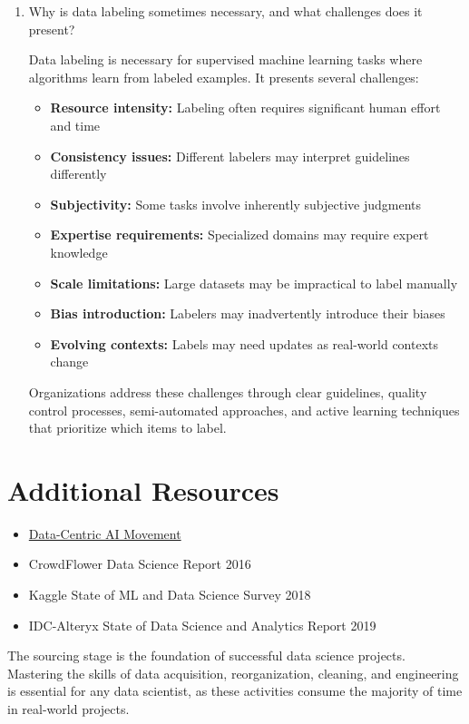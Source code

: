 \documentclass[12pt]{article}
\begin{document}
\begin{enumerate}
    \item Why is data labeling sometimes necessary, and what challenges does it present?
    
    \begin{tcolorbox}[colback=blue!5!white,colframe=blue!75!black,title=Solution]
    Data labeling is necessary for supervised machine learning tasks where algorithms learn from labeled examples. It presents several challenges:
    \begin{itemize}
        \item \textbf{Resource intensity:} Labeling often requires significant human effort and time
        \item \textbf{Consistency issues:} Different labelers may interpret guidelines differently
        \item \textbf{Subjectivity:} Some tasks involve inherently subjective judgments
        \item \textbf{Expertise requirements:} Specialized domains may require expert knowledge
        \item \textbf{Scale limitations:} Large datasets may be impractical to label manually
        \item \textbf{Bias introduction:} Labelers may inadvertently introduce their biases
        \item \textbf{Evolving contexts:} Labels may need updates as real-world contexts change
    \end{itemize}
    Organizations address these challenges through clear guidelines, quality control processes, semi-automated approaches, and active learning techniques that prioritize which items to label.
    \end{tcolorbox}
\end{enumerate}

\section{Additional Resources}

\begin{itemize}
    \item \href{https://datacentricai.org/}{Data-Centric AI Movement}
    \item CrowdFlower Data Science Report 2016
    \item Kaggle State of ML and Data Science Survey 2018
    \item IDC-Alteryx State of Data Science and Analytics Report 2019
\end{itemize}

\begin{tcolorbox}[colback=red!5!white,colframe=red!75!black,title=Key Takeaway]
The sourcing stage is the foundation of successful data science projects. Mastering the skills of data acquisition, reorganization, cleaning, and engineering is essential for any data scientist, as these activities consume the majority of time in real-world projects.
\end{tcolorbox}
\end{document}
